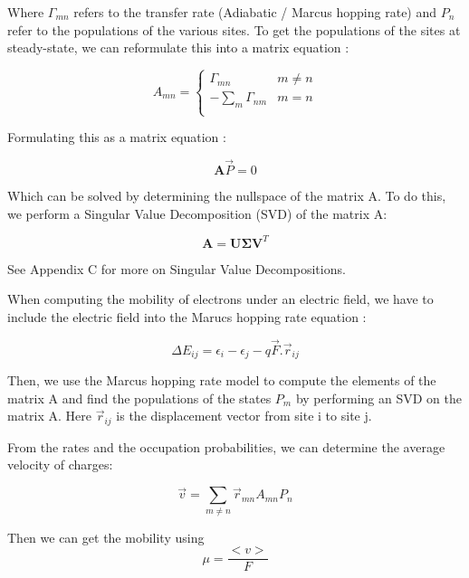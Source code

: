 Where $\Gamma_{mn}$ refers to the transfer rate (Adiabatic / Marcus hopping rate) and $P_n$ refer to the populations of the various sites. To get the populations of the sites at steady-state, we can reformulate this into a matrix equation :

\begin{equation}
    A_{mn} = \begin{cases} 
        \Gamma_{mn} & m\neq n \\
      -\sum_{m} \Gamma_{nm} & m = n \\ 
   \end{cases}
\end{equation}

Formulating this as a matrix equation :

\begin{equation}
    \boldsymbol{A} \vec{P} = 0
\end{equation}


Which can be solved by determining the nullspace of the matrix A. To do this, we perform a Singular Value Decomposition (SVD) of the matrix A:

\begin{equation}
    \boldsymbol{A} = \boldsymbol{U \Sigma V}^{T}
\end{equation}

See Appendix C for more on Singular Value Decompositions.

When computing the mobility of electrons under an electric field, we have to include the electric field into the Marucs hopping rate equation :

\begin{equation}
    \Delta E_{ij} = \epsilon_{i} - \epsilon_{j} - q \vec{F} . \vec{r}_{ij}
\end{equation}

Then, we use the Marcus hopping rate model to compute the elements of the matrix A  and find the populations of the states $P_m$ by performing an SVD on the matrix A. Here $\vec{r}_{ij}$ is the displacement vector from site i to site j.

From the rates and the occupation probabilities, we can determine the average velocity of charges:

\begin{equation}
\vec{v} = \sum_{m \neq n} \vec{r}_{mn} A_{mn} P_n 
\end{equation}

Then we can get the mobility using 
\begin{equation}
\mu = \frac{<v>}{F}
\end{equation}

